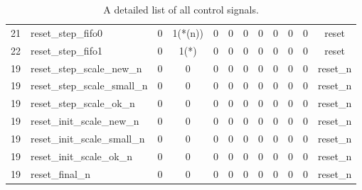 \documentclass[mscthesis]{usiinfthesis}
\begin{document}
\begin{table}
\begin{center}
\begin{tabular}{|c|l|*{10}{c|}}
    21   & reset\_step\_fifo0          & 0    & 1(*(n))& 0    & 0          & 0      & 0      & 0    & 0    & 0     & reset       \\
    22   & reset\_step\_fifo1          & 0    & 1(*)   & 0    & 0          & 0      & 0      & 0    & 0    & 0     & reset       \\
    19   & reset\_step\_scale\_new\_n  & 0    & 0      & 0    & 0          & 0      & 0      & 0    & 0    & 0     & reset\_n    \\
    19   & reset\_step\_scale\_small\_n& 0    & 0      & 0    & 0          & 0      & 0      & 0    & 0    & 0     & reset\_n    \\
    19   & reset\_step\_scale\_ok\_n   & 0    & 0      & 0    & 0          & 0      & 0      & 0    & 0    & 0     & reset\_n    \\
    19   & reset\_init\_scale\_new\_n  & 0    & 0      & 0    & 0          & 0      & 0      & 0    & 0    & 0     & reset\_n    \\
    19   & reset\_init\_scale\_small\_n& 0    & 0      & 0    & 0          & 0      & 0      & 0    & 0    & 0     & reset\_n    \\
    19   & reset\_init\_scale\_ok\_n   & 0    & 0      & 0    & 0          & 0      & 0      & 0    & 0    & 0     & reset\_n    \\
    19   & reset\_final\_n             & 0    & 0      & 0    & 0          & 0      & 0      & 0    & 0    & 0     & reset\_n    \\
    \hline
    \end{tabular}
    \end{center}
    \caption{A detailed list of all control signals.}
    \label{tab:ctrl_detailed}
\end{table}

\backmatter


%
%
%
%
%

%

\printglossaries

\end{document}
